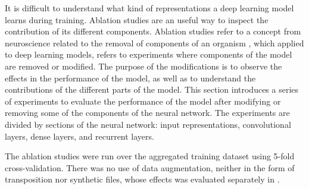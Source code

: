 
It is difficult to understand what kind of representations a
deep learning model learns during training. Ablation studies
are an useful way to inspect the contribution of its
different components. Ablation studies refer to a concept
from neuroscience related to the removal of components of an
organism \parencite{meyes2019ablation}, which applied to
deep learning models, refers to experiments where components
of the model are removed or modified. The purpose of the
modifications is to observe the effects in the performance
of the model, as well as to understand the contributions of
the different parts of the model. This section introduces a
series of experiments to evaluate the performance of the
model after modifying or removing some of the components of
the neural network. The experiments are divided by sections
of the neural network: input representations, convolutional
layers, dense layers, and recurrent layers.

The ablation studies were run over the aggregated training
dataset using 5-fold cross-validation. There was no use of
data augmentation, neither in the form of transposition nor
synthetic files, whose effects was evaluated separately in
.
